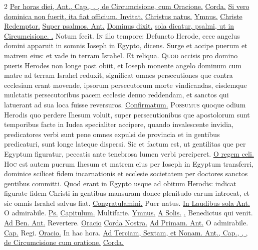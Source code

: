 \begin{multicols*}{2}
\newline \ul{Per horas diei, Ant., Cap., \Rbar , \Vbar , de Circumcisione, cum Oracione.} \hyperlink{corda-nostra-vigilia-epiphanie}{Corda.} \ul{Si vero dominica non fuerit, ita fiat officium. Invitat.} \hyperlink{christus-natus-invitatorium}{Christus natus.} \ul{Ymnus.} \hyperlink{christe-redemptor}{Christe Redemptor.} \ul{Super psalmos. Ant.} \hyperlink{ant-dominus-dixit}{Dominus dixit.} \ul{sola dicatur, psalmi, ut in Circumcisione. \Vbar .} Notum fecit.
\lettrine[lines=2]{\zallmancaps \color{Red} I}{n} illo tempore: Defuncto Herode, ecce angelus domini apparuit in somnis Ioseph in Egypto, dicens. Surge et accipe puerum et matrem eius: et vade in terram Israhel. Et reliqua.
\lettrine[lines=2]{\zallmancaps \color{Blue} Q}{uod} occisis pro domino pueris Herodes non longe post obiit, et Ioseph monente angelo dominum cum matre ad terram Israhel reduxit, significat omnes persecutiones que contra ecclesiam erant movende, ipsorum persecutorum morte vindicandas, eisdemque mulctatis persecutoribus pacem ecclesie denuo reddendam, et sanctos qui latuerant ad sua loca fuisse reversuros. \R \hyperlink{confirmatum-est-cor}{Confirmatum.}
\lettrine[lines=2]{\zallmancaps \color{Red} P}{ossumus} quoque odium Herodis quo perdere Ihesum voluit, super persecutionibus que apostolorum sunt temporibus facte in Iudea specialiter accipere, quando invalescente invidia, predicatores verbi sunt pene omnes expulsi de provincia et in gentibus predicaturi, sunt longe lateque dispersi. Sic et factum est, ut gentilitas que per Egyptum figuratur, peccatis ante tenebrosa lumen verbi perciperet. \R \hyperlink{o-regem-celi}{O regem celi.}
\lettrine[lines=2]{\zallmancaps \color{Blue} H}{oc} est autem puerum Ihesum et matrem eius per Ioseph in Egyptum transferri, dominice scilicet fidem incarnationis et ecclesie societatem per doctores sanctos gentibus committi. Quod erant in Egypto usque ad obitum Herodis: indicat figurate fidem Christi in gentibus mansuram donec plenitudo earum introeat, et sic omnis Israhel salvus fiat. \R \hyperlink{congratulamini-michi-circumcisione}{Congratulamini.}  \V Puer natus.
\newline \ul{In Laudibus sola Ant.} O admirabile. \ul{Ps.}  \ul{Capitulum.} Multifarie. \ul{Ymnus.} \hyperlink{a-solis-ortus}{A Solis.} \ul{\Vbar .} Benedictus qui venit. \ul{Ad Ben. Ant.} Revertere. \ul{Oracio} \hyperlink{corda-nostra-vigilia-epiphanie}{Corda Nostra.} \ul{Ad Primam. Ant.} O admirabile. \ul{Cap.} Regi. \ul{Oracio.} In hac hora. \ul{Ad Terciam, Sextam, et Nonam. Ant., Cap., \Rbar , \Vbar , de Circumcisione cum oratione.} \hyperlink{corda-nostra-vigilia-epiphanie}{Corda.}

\end{multicols*}
